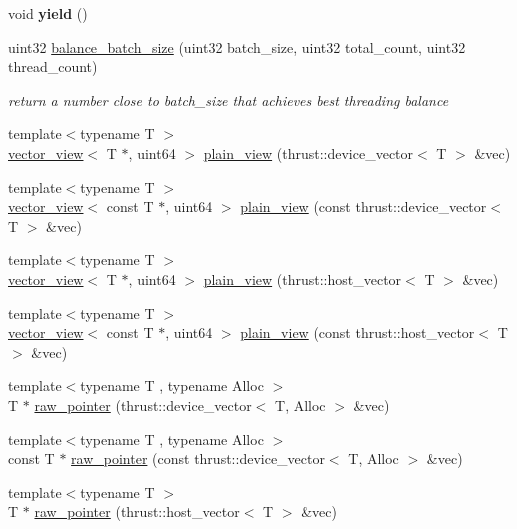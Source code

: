 \begin{DoxyCompactItemize}
void {\bfseries yield} ()
\item 
uint32 \hyperlink{group___threads_gabd840f91a015ca8c052ba4601fda2a73}{balance\+\_\+batch\+\_\+size} (uint32 batch\+\_\+size, uint32 total\+\_\+count, uint32 thread\+\_\+count)
\begin{DoxyCompactList}\small\item\em return a number close to batch\+\_\+size that achieves best threading balance \end{DoxyCompactList}\item 
{\footnotesize template$<$typename T $>$ }\\\hyperlink{structcugar_1_1vector__view}{vector\+\_\+view}$<$ T $\ast$, uint64 $>$ \hyperlink{namespacecugar_a347f91de482f0cb8dcba21c086b0aa46}{plain\+\_\+view} (thrust\+::device\+\_\+vector$<$ T $>$ \&vec)
\item 
{\footnotesize template$<$typename T $>$ }\\\hyperlink{structcugar_1_1vector__view}{vector\+\_\+view}$<$ const T $\ast$, uint64 $>$ \hyperlink{namespacecugar_a86cf54788cfd00efc24da9269d9b1a04}{plain\+\_\+view} (const thrust\+::device\+\_\+vector$<$ T $>$ \&vec)
\item 
{\footnotesize template$<$typename T $>$ }\\\hyperlink{structcugar_1_1vector__view}{vector\+\_\+view}$<$ T $\ast$, uint64 $>$ \hyperlink{namespacecugar_af50a23b6cb5eccef926723e8e1897642}{plain\+\_\+view} (thrust\+::host\+\_\+vector$<$ T $>$ \&vec)
\item 
{\footnotesize template$<$typename T $>$ }\\\hyperlink{structcugar_1_1vector__view}{vector\+\_\+view}$<$ const T $\ast$, uint64 $>$ \hyperlink{namespacecugar_a6279f80126086dcd67bd15568afc6ea9}{plain\+\_\+view} (const thrust\+::host\+\_\+vector$<$ T $>$ \&vec)
\item 
{\footnotesize template$<$typename T , typename Alloc $>$ }\\T $\ast$ \hyperlink{namespacecugar_a3f6cb2c817f2ba065931cec569aa848b}{raw\+\_\+pointer} (thrust\+::device\+\_\+vector$<$ T, Alloc $>$ \&vec)
\item 
{\footnotesize template$<$typename T , typename Alloc $>$ }\\const T $\ast$ \hyperlink{namespacecugar_a2bf23999e5234360b8e10c22d7336b2c}{raw\+\_\+pointer} (const thrust\+::device\+\_\+vector$<$ T, Alloc $>$ \&vec)
\item 
{\footnotesize template$<$typename T $>$ }\\T $\ast$ \hyperlink{namespacecugar_a3887e33637b5ebf98a3d9b81b806571c}{raw\+\_\+pointer} (thrust\+::host\+\_\+vector$<$ T $>$ \&vec)

\end{DoxyCompactItemize}
